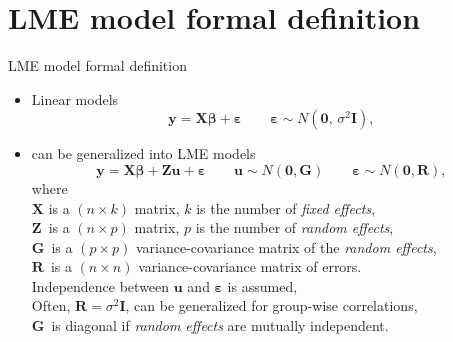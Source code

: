 \documentclass{beamer}
\begin{document}
\section{LME model formal definition}
\begin{frame}{LME model formal definition}
\begin{itemize}
\item Linear models 
$$\bm{y} = \bm{X \beta} + \bm{\varepsilon} 
\qquad \bm{\varepsilon} \sim N(\bm{0}, \,\sigma^2 \bm{I}),$$

\item can be generalized into LME models
$$\bm{y} = \bm{X \beta} + \bm{Z u} + \bm{\varepsilon} 
\qquad \bm{u} \sim N(\bm{0}, \bm{G})
\qquad \bm{\varepsilon} \sim N(\bm{0}, \bm{R}),$$
where\\
$\bm{X}$ is a $(n \! \times \! k)$ matrix, $k$ is the number of \textit{fixed effects},\\
$\bm{Z}\,$ is a $(n \! \times \! p)$ matrix, $p$ is the number of \textit{random effects},\\
$\bm{G}\,$ is a $(p \! \times \! p)$ variance-covariance matrix of the \textit{random effects},\\
$\bm{R}\,$ is a $(n \! \times \! n)$ variance-covariance matrix of errors.\\
\medskip
Independence between $\bm{u}$ and $\bm{\varepsilon}$ is assumed,\\
Often, $\bm{R}=\sigma^2 \bm{I}$, can be generalized for group-wise correlations,\\
$\bm{G}\,$ is diagonal if \textit{random effects} are mutually independent.
\end{itemize}
\end{frame}
\end{document}

